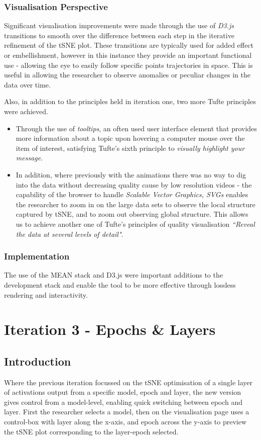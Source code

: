 \documentclass[a4paper,11pt,titlepage]{article}
\begin{document}
		\subsubsection{Visualisation Perspective}
		Significant visualisation improvements were made through the use of \textit{D3.js} transitions to smooth over the difference between each step in the iterative refinement of the tSNE plot. These transitions are typically used for added effect or embellishment, however in this instance they provide an important functional use - allowing the eye to easily follow specific points trajectories in space. This is useful in allowing the researcher to observe anomalies or peculiar changes in the data over time.	
	\par
	 Also, in addition to the principles held in iteration one, two more Tufte principles were achieved. 
	\begin{itemize}
		\item Through the use of \textit{tooltips}, an often used user interface element that provides more information about a topic upon hovering a computer mouse over the item of interest, satisfying Tufte's sixth principle to \textit{visually highlight your message}. 
		\item In addition, where previously with the animations there was no way to dig into the data without decreasing quality cause by low resolution videos - the capability of the browser to handle \textit{Scalable Vector Graphics, SVGs} enables the researcher to zoom in on the large data sets to observe the local structure captured by tSNE, and to zoom out observing global structure. This allows us to achieve another one of Tufte's principles of quality visualisation  \textit{``Reveal the data at several levels of detail"}. 
	\end{itemize}
	
\subsubsection{Implementation}
The use of the MEAN stack and D3.js were important additions to the development stack and enable the tool to be more effective through lossless rendering and interactivity.
\clearpage 
				
\section{Iteration 3 - Epochs \& Layers}
	\subsection{Introduction}
	Where the previous iteration focussed on the tSNE optimisation of a single layer of activations output from a specific model, epoch and layer, the new version gives control from a model-level, enabling quick switching between epoch and layer. First the researcher selects a model, then on the visualisation page uses a control-box with layer along the x-axis, and epoch across the y-axis to preview the tSNE plot corresponding to the layer-epoch selected.
	\par 
		
\end{document}
